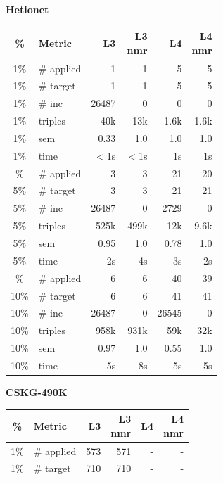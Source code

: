 \documentclass[a4paper,UKenglish,cleveref, autoref, thm-restate]{tgdk-v2021}
\begin{document}
\begin{table}[ht]
\begin{minipage}[t]{0.49\linewidth}
\centering
\textbf{Hetionet}\\
\begin{tabular}{c l | r r r r}
\toprule
\% & Metric & L3 & \shortstack{L3\\nmr} & L4 & \shortstack{L4\\nmr} \\
\midrule
1\%  & \# applied & 1 & 1 & 5 & 5 \\
1\%  & \# target  & 1 & 1 & 5 & 5 \\
1\%  & \# inc     & 26487 & 0 & 0 & 0 \\
1\%  & triples    & 40k & 13k & 1.6k & 1.6k \\
1\%  & sem    &0.33 &1.0 & 1.0 & 1.0 \\
1\%  & time      & $<$1s & $<$1s & 1s & 1s \\
\addlinespace
5\%  & \# applied & 3 & 3 & 21 & 20 \\
5\%  & \# target  & 3 & 3 & 21 & 21 \\
5\%  & \# inc     & 26487 & 0 & 2729 & 0 \\
5\%  & triples    & 525k & 499k & 12k & 9.6k \\
5\%  & sem    & 0.95 &1.0 & 0.78 & 1.0\\
5\%  & time      & 2s & 4s & 3s & 2s \\
\addlinespace
10\% & \# applied & 6 & 6 & 40 & 39 \\
10\% & \# target  & 6 & 6 & 41 & 41 \\
10\% & \# inc     & 26487 & 0 & 26545 & 0 \\
10\% & triples    & 958k & 931k & 59k & 32k \\
10\%  & sem    & 0.97&1.0 & 0.55& 1.0\\
10\% & time      & 5s & 8s & 5s & 5s \\
\bottomrule
\end{tabular}
\end{minipage}%
\hfill
\begin{minipage}[t]{0.49\linewidth}
\centering
\textbf{CSKG-490K}\\
\begin{tabular}{c l | r r r r}
\toprule
\% & Metric & L3 & \shortstack{L3\\nmr} & L4 & \shortstack{L4\\nmr} \\
\midrule
1\% & \# applied & 573 & 571 & - & - \\
1\% & \# target & 710 & 710 & - & - \\

\end{tabular}
\end{minipage}
\end{table}
\end{document}
